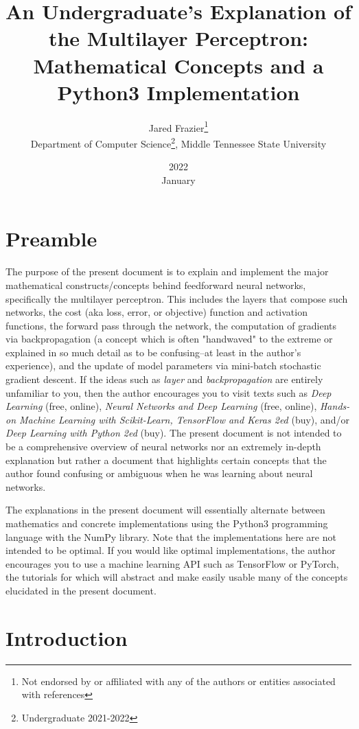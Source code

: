 \documentclass{article}
\title{
	An Undergraduate's Explanation of the Multilayer Perceptron: 
	Mathematical Concepts and a Python3 Implementation}
\date{2022 \\ January}
\author{Jared Frazier\thanks{Not endorsed by or affiliated with any of the 
authors or entities associated with references} 
\\ Department of Computer Science\thanks{Undergraduate 2021-2022}, 
Middle Tennessee State University}
\begin{document}
\maketitle

\section{Preamble}
\quad The purpose of the present document is to explain and implement the major mathematical
constructs/concepts behind feedforward neural networks, specifically the multilayer perceptron.
This includes the layers that compose such networks, the cost (aka loss, error, or objective) function
and activation functions, the forward pass through the network,
the computation of gradients via backpropagation (a concept which is often "handwaved" to the extreme
or explained in so much detail as to be confusing--at least in the author's experience),
and the update of model parameters via mini-batch stochastic gradient descent.
If the ideas such as \textit{layer} and \textit{backpropagation} are entirely unfamiliar
to you, then the author encourages you to visit texts such as
\textit{Deep Learning} (free, online), \textit{Neural Networks and Deep Learning} (free, online), 
\textit{Hands-on Machine Learning with Scikit-Learn, TensorFlow and Keras 2ed} (buy),
and/or \textit{Deep Learning with Python 2ed} (buy). The present document
is not intended to be a comprehensive overview of neural networks nor an extremely
in-depth explanation but rather a document that highlights certain concepts that the
author found confusing or ambiguous when he was learning about neural networks.

The explanations in the present document will essentially alternate between mathematics
and concrete implementations using the Python3 programming language with
the NumPy library. Note that the implementations here
are not intended to be optimal. If you would like optimal implementations, the author
encourages you to use a machine learning API such as TensorFlow or PyTorch, the tutorials
for which will abstract and make easily usable many of the concepts elucidated in
the present document.

\section{Introduction}
\end{document}
